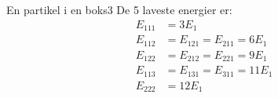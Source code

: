 \begin{opgave}{En partikel i en boks}{3}
De 5 laveste energier er:
\begin{align*}
    E_{111} &= 3E_1\\
    E_{112} &= E_{121} = E_{211} = 6E_1\\
    E_{122} &= E_{212} = E_{221} = 9E_1\\
    E_{113} &= E_{131} = E_{311} = 11E_1\\
    E_{222} &= 12E_1
\end{align*}
\end{opgave}
